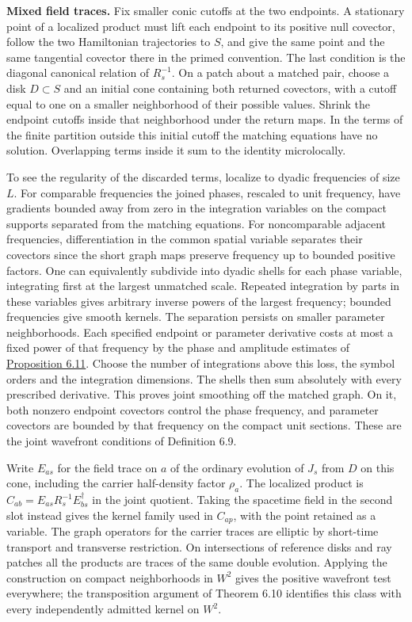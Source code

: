 \documentclass[
  english,
  11pt,
  reqno]{amsart}
\begin{document}
\textbf{Mixed field traces.} Fix smaller conic cutoffs at the two
endpoints. A stationary point of a localized product must lift each
endpoint to its positive null covector, follow the two Hamiltonian
trajectories to \(S\), and give the same point and the same tangential
covector there in the primed convention. The last condition is the
diagonal canonical relation of \(R_s^{-1}\). On a patch about a matched
pair, choose a disk \(D\subset S\) and an initial cone containing both
returned covectors, with a cutoff equal to one on a smaller neighborhood
of their possible values. Shrink the endpoint cutoffs inside that
neighborhood under the return maps. In the terms of the finite partition
outside this initial cutoff the matching equations have no solution.
Overlapping terms inside it sum to the identity microlocally.

To see the regularity of the discarded terms, localize to dyadic
frequencies of size \(L\). For comparable frequencies the joined phases,
rescaled to unit frequency, have gradients bounded away from zero in the
integration variables on the compact supports separated from the
matching equations. For noncomparable adjacent frequencies,
differentiation in the common spatial variable separates their covectors
since the short graph maps preserve frequency up to bounded positive
factors. One can equivalently subdivide into dyadic shells for each
phase variable, integrating first at the largest unmatched scale.
Repeated integration by parts in these variables gives arbitrary inverse
powers of the largest frequency; bounded frequencies give smooth
kernels. The separation persists on smaller parameter neighborhoods.
Each specified endpoint or parameter derivative costs at most a fixed
power of that frequency by the phase and amplitude estimates of
\hyperref[prop:online-wave-kernel-finite-families]{Proposition 6.11}.
Choose the number of integrations above this loss, the symbol orders and
the integration dimensions. The shells then sum absolutely with every
prescribed derivative. This proves joint smoothing off the matched
graph. On it, both nonzero endpoint covectors control the phase
frequency, and parameter covectors are bounded by that frequency on the
compact unit sections. These are the joint wavefront conditions of
Definition 6.9.

Write \(E_{as}\) for the field trace on \(a\) of the ordinary evolution
of \(J_s\) from \(D\) on this cone, including the carrier half-density
factor \(\rho_a\). The localized product is
\(C_{ab}=E_{as}R_s^{-1}E_{bs}^\dagger\) in the joint quotient. Taking
the spacetime field in the second slot instead gives the kernel family
used in \(C_{ap}\), with the point retained as a variable. The graph
operators for the carrier traces are elliptic by short-time transport
and transverse restriction. On intersections of reference disks and ray
patches all the products are traces of the same double evolution.
Applying the construction on compact neighborhoods in \(W^2\) gives the
positive wavefront test everywhere; the transposition argument of
Theorem 6.10 identifies this class with every independently admitted
kernel on \(W^2\).
\end{document}
